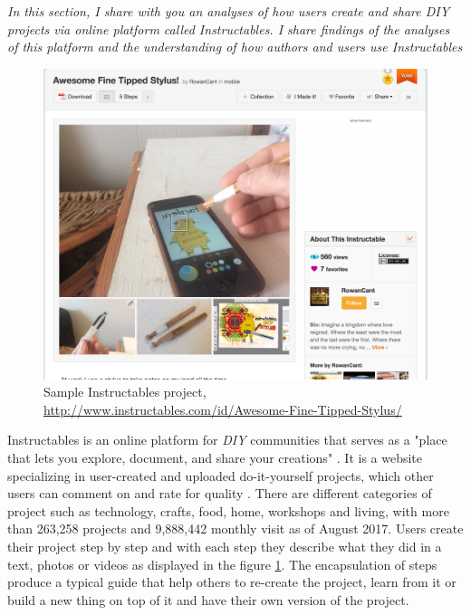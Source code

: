 \begin{center}
	\begin{minipage}{.7\textwidth}
		\textit{In this section, I share with you an analyses of how users create and share \textit{DIY} projects via online platform called Instructables. I share findings of the analyses of this platform and the understanding of how authors and users use Instructables}
	\end{minipage}
\end{center}

\begin{figure}[ht!]
	\includegraphics[scale=0.36]{./images/img-instructables.png}
	\caption{Sample Instructables project, \url{http://www.instructables.com/id/Awesome-Fine-Tipped-Stylus/}}
	\label{sec:img-instructables}
\end{figure}

Instructables is an online platform for \textit{DIY} communities that serves as a "place that lets you explore, document, and share your creations" \cite{web:instructable}. It is a website specializing in user-created and uploaded do-it-yourself projects, which other users can comment on and rate for quality \cite{wiki:instructable} \cite{wiki:instructable}. There are different categories of project such as technology, crafts, food, home, workshops and living, with more than 263,258 projects and 9,888,442 monthly visit as of August 2017. Users create their project step by step and with each step they describe what they did in a text, photos or videos as displayed in the figure \ref{sec:img-instructables}. The encapsulation of steps produce a typical guide that help others to re-create the project, learn from it or build a new thing on top of it and have their own version of the project. 

